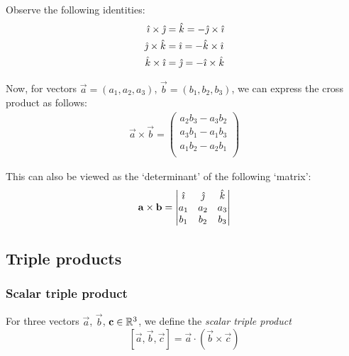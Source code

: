 \documentclass{../template/note}
\begin{document}
    Observe the following identities:
    \begin{align*}
        \hat \imath \times \hat \jmath &= \hat k = -\hat \jmath \times \hat \imath \\
        \hat \jmath \times \hat k &= \hat \imath = -\hat k \times \hat \imath \\
        \hat k \times \hat \imath &= \hat \jmath = -\hat \imath \times \hat k
    \end{align*}
    
    Now, for vectors \(\vec a = (a_1, a_2, a_3)\), \(\vec b = (b_1, b_2, b_3)\), we can express the cross product as follows:
    \begin{align*}
        \vec a \times \vec b =
        \begin{pmatrix}
         a_2b_3-a_3b_2 \\
         a_3b_1-a_1b_3 \\
         a_1b_2-a_2b_1 \\
        \end{pmatrix}
    \end{align*}
    
    This can also be viewed as the `determinant' of the following `matrix':
    \begin{align*}
        \vec a \times \vec b = \begin{vmatrix}
         \ihat & \jhat & \khat \\
         a_1 & a_2 & a_3 \\
         b_1 & b_2 & b_3 \\
        \end{vmatrix}
    \end{align*}
    
    \subsection{Triple products}

    \subsubsection{Scalar triple product}

    \begin{definition}
        
        For three vectors \(\vec a\), \(\vec b\), \(\vec c \in \RR^3\), we define the \emph{scalar triple product}
        \[
            [\vec a, \vec b, \vec c] = \vec a \cdot (\vec b \times \vec c)
        \]

    \end{definition}
    
\end{document}
